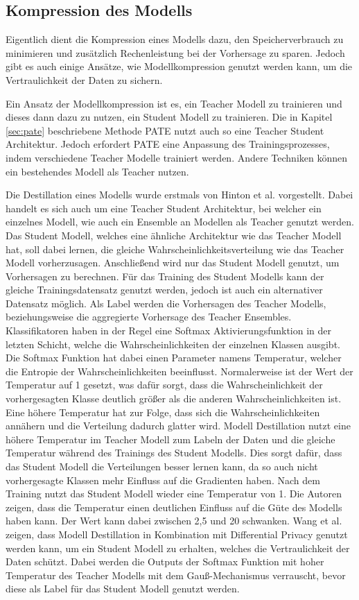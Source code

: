 \subsection{Kompression des Modells}\label{sec:kompression}

Eigentlich dient die Kompression eines Modells dazu, den Speicherverbrauch zu minimieren und zusätzlich Rechenleistung bei der Vorhersage zu sparen.
Jedoch gibt es auch einige Ansätze, wie Modellkompression genutzt werden kann, um die Vertraulichkeit der Daten zu sichern.

Ein Ansatz der Modellkompression ist es, ein Teacher Modell zu trainieren und dieses dann dazu zu nutzen, ein Student Modell zu trainieren. 
Die in Kapitel \ref{sec:pate} beschriebene Methode PATE nutzt auch so eine Teacher Student Architektur. 
Jedoch erfordert PATE eine Anpassung des Trainingsprozesses, indem verschiedene Teacher Modelle trainiert werden.
Andere Techniken können ein bestehendes Modell als Teacher nutzen.

Die Destillation eines Modells wurde erstmals von Hinton et al. \cite{P-61} vorgestellt.
Dabei handelt es sich auch um eine Teacher Student Architektur, bei welcher ein einzelnes Modell, wie auch ein Ensemble an Modellen als Teacher genutzt werden.
Das Student Modell, welches eine ähnliche Architektur wie das Teacher Modell hat, soll dabei lernen, die gleiche Wahrscheinlichkeitsverteilung wie das Teacher Modell vorherzusagen.
Anschließend wird nur das Student Modell genutzt, um Vorhersagen zu berechnen.
Für das Training des Student Modells kann der gleiche Trainingsdatensatz genutzt werden, jedoch ist auch ein alternativer Datensatz möglich.
Als Label werden die Vorhersagen des Teacher Modells, beziehungsweise die aggregierte Vorhersage des Teacher Ensembles.
Klassifikatoren haben in der Regel eine Softmax Aktivierungsfunktion in der letzten Schicht, welche die Wahrscheinlichkeiten der einzelnen Klassen ausgibt.
Die Softmax Funktion hat dabei einen Parameter namens Temperatur, welcher die Entropie der Wahrscheinlichkeiten beeinflusst. 
Normalerweise ist der Wert der Temperatur auf 1 gesetzt, was dafür sorgt, dass die Wahrscheinlichkeit der vorhergesagten Klasse deutlich größer als die anderen Wahrscheinlichkeiten ist.
Eine höhere Temperatur hat zur Folge, dass sich die Wahrscheinlichkeiten annähern und die Verteilung dadurch glatter wird.
Modell Destillation nutzt eine höhere Temperatur im Teacher Modell zum Labeln der Daten und die gleiche Temperatur während des Trainings des Student Modells.
Dies sorgt dafür, dass das Student Modell die Verteilungen besser lernen kann, da so auch nicht vorhergesagte Klassen mehr Einfluss auf die Gradienten haben.
Nach dem Training nutzt das Student Modell wieder eine Temperatur von 1.
Die Autoren zeigen, dass die Temperatur einen deutlichen Einfluss auf die Güte des Modells haben kann. 
Der Wert kann dabei zwischen 2,5 und 20 schwanken.
Wang et al. \cite{P-64} zeigen, dass Modell Destillation in Kombination mit Differential Privacy  genutzt werden kann, um ein Student Modell zu erhalten, welches die Vertraulichkeit der Daten schützt. 
Dabei werden die Outputs der Softmax Funktion mit hoher Temperatur des Teacher Modells mit dem Gauß-Mechanismus verrauscht, bevor diese als Label für das Student Modell genutzt werden.

